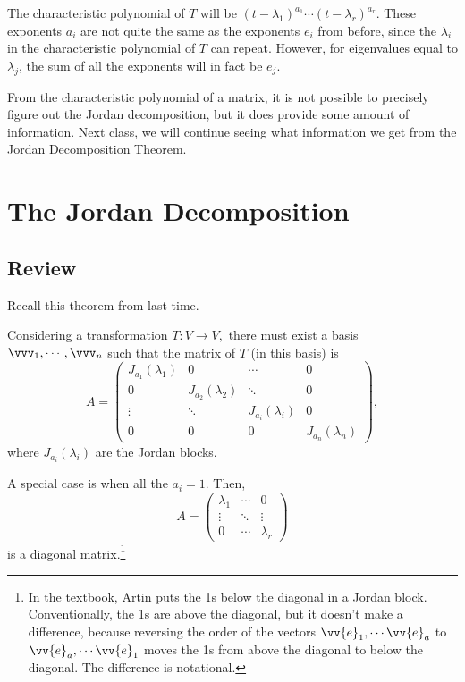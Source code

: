 The characteristic polynomial of $T$ will be $(t-\lambda_1)^{a_1} \cdots (t - \lambda_r)^{a_r}$. These exponents $a_i$ are not quite the same as the exponents $e_i$ from before, since the $\lambda_i$ in the characteristic polynomial of $T$ can repeat. However, for eigenvalues equal to $\lambda_j$, the sum of all the exponents will in fact be $e_j.$ 

From the characteristic polynomial of a matrix, it is not possible to precisely figure out the Jordan decomposition, but it does provide some amount of information. Next class, we will continue seeing what information we get from the Jordan Decomposition Theorem.

\newpage


\section{The Jordan Decomposition}
\subsection{Review}
Recall this theorem from last time.

\begin{theorem}
Considering a transformation $T: V \rightarrow V,$ there must exist a basis $\vvv_1, \cdots, \vvv_n$ such that the matrix of $T$ (in this basis) is 
\[
A = \begin{pmatrix}
J_{a_1}(\lambda_1) & 0 & \cdots & 0 \\
0 & J_{a_2}(\lambda_2) & \ddots & 0 \\
\vdots & \ddots  & J_{a_i}(\lambda_i) & 0 \\

0 & 0 & 0 & J_{a_n}(\lambda_n)
\end{pmatrix},
\]
where $J_{a_i}(\lambda_i)$ are the Jordan blocks.
\end{theorem}

A special case is when all the $a_i = 1.$ Then, 
\[
A = \begin{pmatrix}
\lambda_1 & \cdots & 0 \\
\vdots & \ddots & \vdots \\
0 & \cdots & \lambda_r
\end{pmatrix}
\]
is a diagonal matrix.\footnote{In the textbook, Artin puts the 1s below the diagonal in a Jordan block. Conventionally, the 1s are above the diagonal, but it doesn't make a difference, because reversing the order of the vectors $\vv{e}_1, \cdots \vv{e}_a$ to $\vv{e}_a, \cdots \vv{e}_1$ moves the 1s from above the diagonal to below the diagonal. The difference is notational.}

